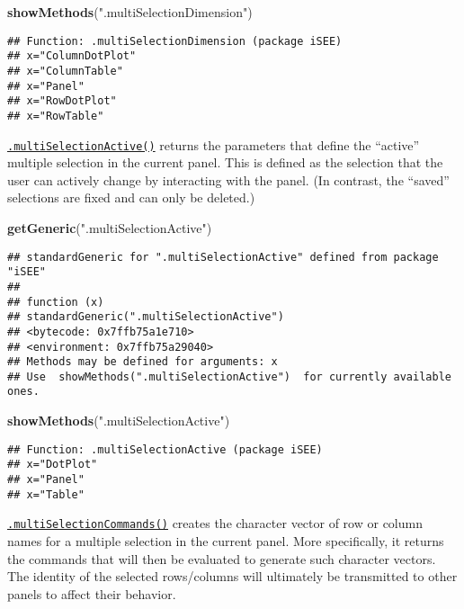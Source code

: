 \documentclass[
]{book}
\newenvironment{Shaded}{\begin{snugshade}}{\end{snugshade}}
\newcommand{\KeywordTok}[1]{\textcolor[rgb]{0.13,0.29,0.53}{\textbf{#1}}}
\newcommand{\NormalTok}[1]{#1}
\newcommand{\StringTok}[1]{\textcolor[rgb]{0.31,0.60,0.02}{#1}}
\begin{document}
\begin{Shaded}
\begin{Highlighting}[]
\KeywordTok{showMethods}\NormalTok{(}\StringTok{".multiSelectionDimension"}\NormalTok{)}
\end{Highlighting}
\end{Shaded}

\begin{verbatim}
## Function: .multiSelectionDimension (package iSEE)
## x="ColumnDotPlot"
## x="ColumnTable"
## x="Panel"
## x="RowDotPlot"
## x="RowTable"
\end{verbatim}

\href{https://isee.github.io/iSEE/reference/multi-select-generics.html}{\texttt{.multiSelectionActive()}} returns the parameters that define the ``active'' multiple selection in the current panel.
This is defined as the selection that the user can actively change by interacting with the panel.
(In contrast, the ``saved'' selections are fixed and can only be deleted.)

\begin{Shaded}
\begin{Highlighting}[]
\KeywordTok{getGeneric}\NormalTok{(}\StringTok{".multiSelectionActive"}\NormalTok{)}
\end{Highlighting}
\end{Shaded}

\begin{verbatim}
## standardGeneric for ".multiSelectionActive" defined from package "iSEE"
## 
## function (x) 
## standardGeneric(".multiSelectionActive")
## <bytecode: 0x7ffb75a1e710>
## <environment: 0x7ffb75a29040>
## Methods may be defined for arguments: x
## Use  showMethods(".multiSelectionActive")  for currently available ones.
\end{verbatim}

\begin{Shaded}
\begin{Highlighting}[]
\KeywordTok{showMethods}\NormalTok{(}\StringTok{".multiSelectionActive"}\NormalTok{)}
\end{Highlighting}
\end{Shaded}

\begin{verbatim}
## Function: .multiSelectionActive (package iSEE)
## x="DotPlot"
## x="Panel"
## x="Table"
\end{verbatim}

\href{https://isee.github.io/iSEE/reference/multi-select-generics.html}{\texttt{.multiSelectionCommands()}} creates the character vector of row or column names for a multiple selection in the current panel.
More specifically, it returns the commands that will then be evaluated to generate such character vectors.
The identity of the selected rows/columns will ultimately be transmitted to other panels to affect their behavior.
\end{document}
